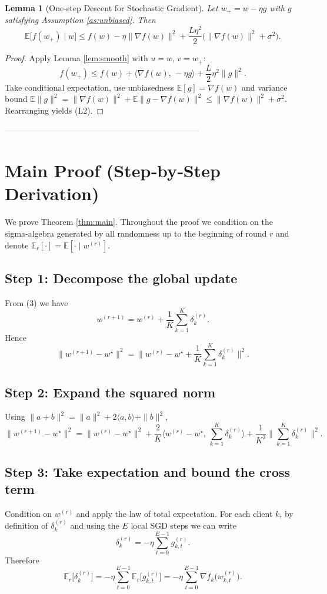 \documentclass{article}
\newtheorem{lemma}{Lemma}
\newcommand{\E}{\mathbb{E}}
\begin{document}
\begin{lemma}[One‑step Descent for Stochastic Gradient]\label{lem:sgd}
Let $w_{+}=w-\eta g$ with $g$ satisfying Assumption \ref{as:unbiased}.
Then
\[
\E\!\big[f(w_{+})\mid w\big]
\le f(w) - \eta\|\nabla f(w)\|^{2}
      + \frac{L\eta^{2}}{2}\big(\|\nabla f(w)\|^{2}+\sigma^{2}\big).
\tag{L2}
\]
\end{lemma}
\begin{proof}
Apply Lemma \ref{lem:smooth} with $u=w$, $v=w_{+}$:
\[
f(w_{+})\le f(w) +\langle\nabla f(w),\, -\eta g\rangle
            +\frac{L}{2}\eta^{2}\|g\|^{2}.
\]
Take conditional expectation, use unbiasedness
$\E[g]=\nabla f(w)$ and variance bound
$\E\|g\|^{2}= \|\nabla f(w)\|^{2}+\E\|g-\nabla f(w)\|^{2}
            \le \|\nabla f(w)\|^{2}+\sigma^{2}$.
Rearranging yields (L2). \qedhere
\end{proof}

-----------------------------------------------------------------------

\section*{Main Proof (Step‑by‑Step Derivation)}
We prove Theorem \ref{thm:main}.  Throughout the proof we condition on the
sigma‑algebra generated by all randomness up to the beginning of round $r$
and denote $\E_r[\cdot]=\E[\cdot\mid w^{(r)}]$.

\subsection*{Step 1: Decompose the global update}
From (3) we have
\[
w^{(r+1)} = w^{(r)} + \frac1K\sum_{k=1}^{K}\delta_k^{(r)} .
\tag{5}
\]
Hence
\[
\|w^{(r+1)}-w^\star\|^{2}
= \Big\| w^{(r)}-w^\star
   +\frac1K\sum_{k=1}^{K}\delta_k^{(r)}\Big\|^{2}.
\tag{6}
\]

\subsection*{Step 2: Expand the squared norm}
Using $\|a+b\|^{2}= \|a\|^{2}+2\langle a,b\rangle+\|b\|^{2}$,
\[
\|w^{(r+1)}-w^\star\|^{2}
= \|w^{(r)}-w^\star\|^{2}
  +\frac{2}{K}\Big\langle w^{(r)}-w^\star,\,
        \sum_{k=1}^{K}\delta_k^{(r)}\Big\rangle
  +\frac1{K^{2}}
        \Big\|\sum_{k=1}^{K}\delta_k^{(r)}\Big\|^{2}.
\tag{7}
\]

\subsection*{Step 3: Take expectation and bound the cross term}
Condition on $w^{(r)}$ and apply the law of total expectation.
For each client $k$, by definition of $\delta_k^{(r)}$ and using the
$E$ local SGD steps we can write
\[
\delta_k^{(r)} = -\eta\sum_{t=0}^{E-1} g_{k,t}^{(r)} .
\tag{8}
\]
Therefore
\[
\E_r\!\big[\delta_k^{(r)}\big]
= -\eta\sum_{t=0}^{E-1}\E_r\!\big[g_{k,t}^{(r)}\big]
= -\eta\sum_{t=0}^{E-1}\nabla f_k\!\big(w_{k,t}^{(r)}\big) .
\tag{9}
\]
\end{document}
